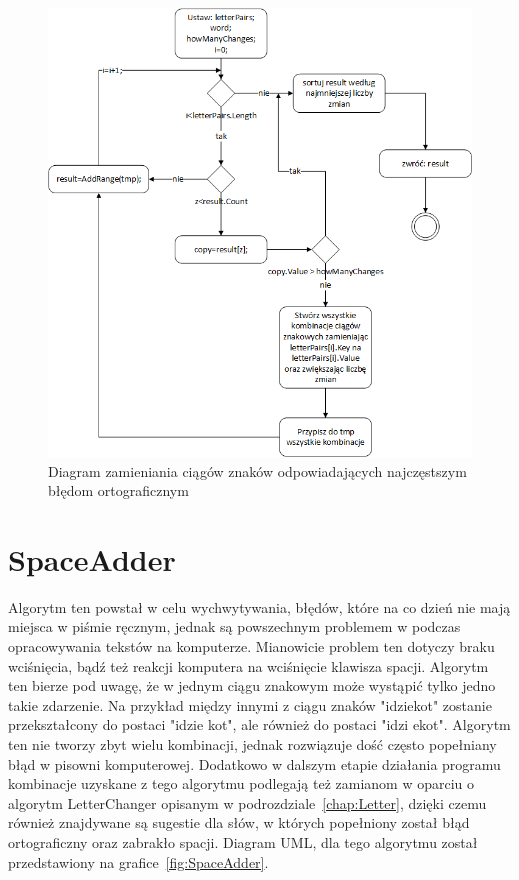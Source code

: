\begin{figure} [H]
	\centering
	\includegraphics[width=1\linewidth]{rozdzial02/LetterChanger.png}
	\caption{Diagram zamieniania ciągów znaków odpowiadających najczęstszym błędom ortograficznym}
	\label{fig:LetterChanger}
\end{figure}

\section{SpaceAdder}
Algorytm ten powstał w celu wychwytywania, błędów, które na co dzień nie mają miejsca w piśmie ręcznym, jednak są powszechnym problemem w podczas opracowywania tekstów na komputerze. Mianowicie problem ten dotyczy braku wciśnięcia, bądź też reakcji komputera na wciśnięcie klawisza spacji. Algorytm ten bierze pod uwagę, że w jednym ciągu znakowym może wystąpić tylko jedno takie zdarzenie. Na przykład między innymi z ciągu znaków "idziekot" zostanie przekształcony do postaci "idzie kot", ale również do postaci "idzi ekot". Algorytm ten nie tworzy zbyt wielu kombinacji, jednak rozwiązuje dość często popełniany błąd w pisowni komputerowej. Dodatkowo w dalszym etapie działania programu kombinacje uzyskane z tego algorytmu podlegają też zamianom w oparciu o algorytm LetterChanger opisanym w podrozdziale~\ref{chap:Letter}, dzięki czemu również znajdywane są sugestie dla słów, w których popełniony został błąd ortograficzny oraz zabrakło spacji. Diagram UML, dla tego algorytmu został przedstawiony na grafice~\ref{fig:SpaceAdder}. 

